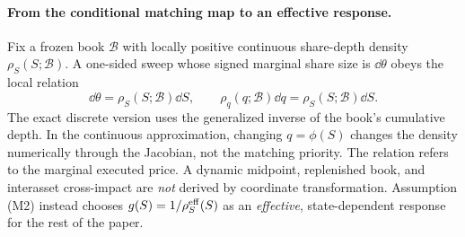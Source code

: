 \documentclass[review,hidelinks,onefignum,onetabnum]{siamonline250211}
\begin{document}
\paragraph{From the conditional matching map to an effective response.} Fix a frozen book $\mathcal B$ with locally positive continuous share-depth density $\rho_S(S;\mathcal B)$. A one-sided sweep whose signed marginal share size is $\dd\theta$ obeys the local relation
\begin{equation}\label{eq:frozen-depth}
\dd\theta=\rho_S(S;\mathcal B)\dd S,
\qquad \rho_q(q;\mathcal B)\dd q=\rho_S(S;\mathcal B)\dd S.
\end{equation}
The exact discrete version uses the generalized inverse of the book's cumulative depth. In the continuous approximation, changing $q=\phi(S)$ changes the density numerically through the Jacobian, not the matching priority. The relation refers to the marginal executed price. A dynamic midpoint, replenished book, and interasset cross-impact are \emph{not} derived by coordinate transformation. Assumption (M2) instead chooses $g(S)=1/\rho_S^{\rm eff}(S)$ as an \emph{effective}, state-dependent response for the rest of the paper.
\end{document}

